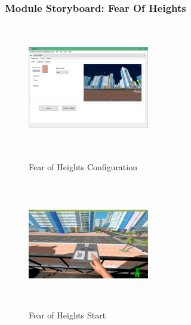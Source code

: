 \documentclass[a4paper,10pt]{article}
\begin{document}
\pagebreak
\subsubsection{Module Storyboard: Fear Of Heights}
\begin{figure}[H]
	\centering
	\begin{minipage}{0.45\textwidth}
		\centering
		\includegraphics[width=200px, height=210px, keepaspectratio]{qtHeightSettings.png}
		\caption{Fear of Heights Configuration}
		\label{fig:qtHeightSettings}
	\end{minipage}\hfill
	\begin{minipage}{0.45\textwidth}
		\centering
		\includegraphics[width=200px, height=210px, keepaspectratio]{heightSS1.png}
		\caption{Fear of Heights Start}
		\label{fig:heightSS1}
	\end{minipage}
\end{figure}
\end{document}
